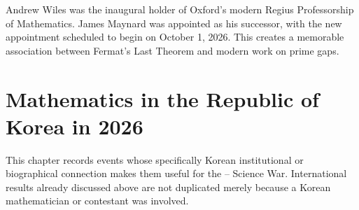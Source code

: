     \begin{fact}
        Andrew Wiles was the inaugural holder of Oxford's modern Regius
        Professorship of Mathematics. James Maynard was appointed as his
        successor, with the new appointment scheduled to begin on October 1,
        2026. This creates a memorable association between Fermat's Last Theorem
        and modern work on prime gaps.
    \end{fact}

    \chapter{Mathematics in the Republic of Korea in 2026}

    This chapter records events whose specifically Korean institutional or
    biographical connection makes them useful for the \POSTECH--\KAIST{} Science
    War. International results already discussed above are not duplicated merely
    because a Korean mathematician or contestant was involved.

    \vspace{1em}

